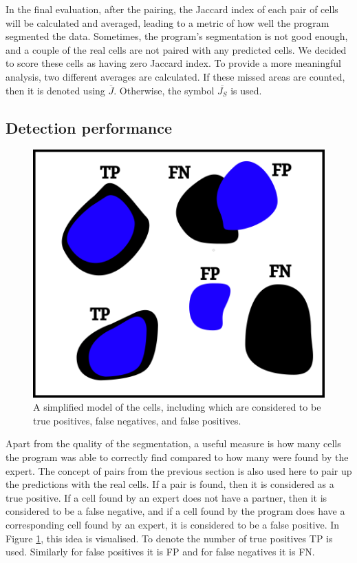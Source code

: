 \documentclass[
  digital,     %
  oneside,     %
  nosansbold,  %
  nocolorbold, %
  lof,         %
  lot,         %
]{fithesis4}
\begin{document}
In the final evaluation, after the pairing, the Jaccard index of each pair of
cells will be calculated and averaged, leading to a metric of how well the
program segmented the data. Sometimes, the program's segmentation is not good enough,
and a couple of the real cells are not paired with any predicted cells. We decided
to score these cells as having zero Jaccard index. To provide a more meaningful analysis,
two different averages are calculated. If these missed areas are counted, then it
is denoted using $\overline{J}$. Otherwise, the symbol $\overline{J_S}$ is used.

\subsection{Detection performance}
\begin{figure}
    \begin{center}
        \includegraphics{resources/inkscape/evaluation_with_TP.png}
    \end{center}
    \caption{A simplified model of the cells, including which are considered to
    be true positives, false negatives, and false positives.}
    \label{fig:evaluation_with_TP}
\end{figure}

Apart from the quality of the segmentation, a useful measure is how many cells
the program was able to correctly find compared to how many were found by the expert. The
concept of pairs from the previous section is also used here to pair up the
predictions with the real cells. If a pair is found, then it is considered as a
true positive. If a cell found by an expert does not have a partner, then it is
considered to be a false negative, and if a cell found by the program does have
a corresponding cell found by an expert, it is considered to be a false
positive. In Figure \ref{fig:evaluation_with_TP}, this idea is visualised. To denote the number of
true positives TP is used. Similarly for false positives it is FP and for false
negatives it is FN.
\end{document}
